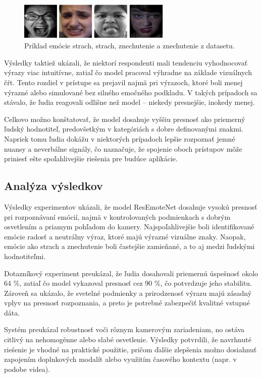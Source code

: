 \begin{figure}[!htpb]
    \centering
    \includegraphics[width=0.65\textwidth]{img/mix_emotions.png}
    \caption{Príklad emócie strach, strach, znechutenie a znechutenie z datasetu.}
    \label{fig:mix_dataset}
\end{figure}
Výsledky taktiež ukázali, že niektorí respondenti mali tendenciu vyhodnocovať výrazy viac intuitívne, zatiaľ čo model pracoval výhradne na základe vizuálnych čŕt. Tento rozdiel v prístupe sa prejavil najmä pri výrazoch, ktoré boli menej výrazné alebo simulované bez silného emočného podkladu. V takých prípadoch sa stávalo, že ľudia reagovali odlišne než model – niekedy presnejšie, inokedy menej.

Celkovo možno konštatovať, že model dosahuje vyššiu presnosť ako priemerný ľudský hodnotiteľ, predovšetkým v kategóriách s dobre definovanými znakmi. Napriek tomu ľudia dokážu v niektorých prípadoch lepšie rozpoznať jemné nuansy a neverbálne signály, čo naznačuje, že spojenie oboch prístupov môže priniesť ešte spoľahlivejšie riešenia pre budúce aplikácie.

\subsection{Analýza výsledkov}

Výsledky experimentov ukázali, že model ResEmoteNet dosahuje vysokú presnosť pri rozpoznávaní emócií, najmä v kontrolovaných podmienkach s dobrým osvetlením a priamym pohľadom do kamery. Najspoľahlivejšie boli identifikované emócie radosť a neutrálny výraz, ktoré majú výrazné vizuálne znaky. Naopak, emócie ako strach a znechutenie boli častejšie zamieňané, a to aj medzi ľudskými hodnotiteľmi.

Dotazníkový experiment preukázal, že ľudia dosahovali priemernú úspešnosť okolo 64 \%, zatiaľ čo model vykazoval presnosť cez 90 \%, čo potvrdzuje jeho stabilitu. Zároveň sa ukázalo, že svetelné podmienky a prirodzenosť výrazu majú zásadný vplyv na presnosť rozpoznania, a preto je potrebné zabezpečiť kvalitné vstupné dáta.

Systém preukázal robustnosť voči rôznym kamerovým zariadeniam, no ostáva citlivý na nehomogénne alebo slabé osvetlenie. Výsledky potvrdili, že navrhnuté riešenie je vhodné na praktické použitie, pričom ďalšie zlepšenia možno dosiahnuť zapojením doplnkových modalít alebo využitím časového kontextu (napr. v podobe videa).

